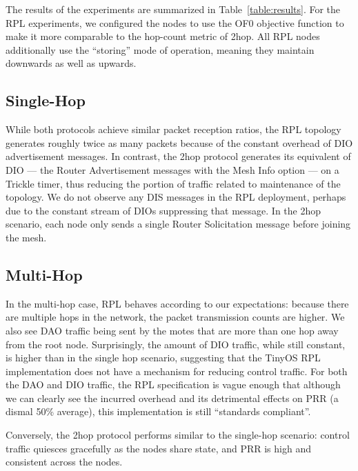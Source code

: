 The results of the experiments are summarized in Table~\ref{table:results}.
For the RPL experiments, we configured the nodes to use the OF0 objective function to make it more comparable to the hop-count metric of 2hop.
All RPL nodes additionally use the ``storing'' mode of operation, meaning they maintain downwards as well as upwards.

\subsection{Single-Hop}

While both protocols achieve similar packet reception ratios, the RPL topology generates roughly twice as many packets because of the constant overhead of DIO advertisement messages.
In contrast, the 2hop protocol generates its equivalent of DIO --- the Router Advertisement messages with the Mesh Info option --- on a Trickle timer, thus reducing the portion of traffic related to maintenance of the topology.
We do not observe any DIS messages in the RPL deployment, perhaps due to the constant stream of DIOs suppressing that message.
In the 2hop scenario, each node only sends a single Router Solicitation message before joining the mesh.

\subsection{Multi-Hop}

In the multi-hop case, RPL behaves according to our expectations: because there are multiple hops in the network, the packet transmission counts are higher.
We also see DAO traffic being sent by the motes that are more than one hop away from the root node.
Surprisingly, the amount of DIO traffic, while still constant, is higher than in the single hop scenario, suggesting that the TinyOS RPL implementation does not have a mechanism for reducing control traffic.
For both the DAO and DIO traffic, the RPL specification is vague enough that although we can clearly see the incurred overhead and its detrimental effects on PRR (a dismal 50\% average), this implementation is still ``standards compliant''.

Conversely, the 2hop protocol performs similar to the single-hop scenario: control traffic quiesces gracefully as the nodes share state, and PRR is high and consistent across the nodes.
